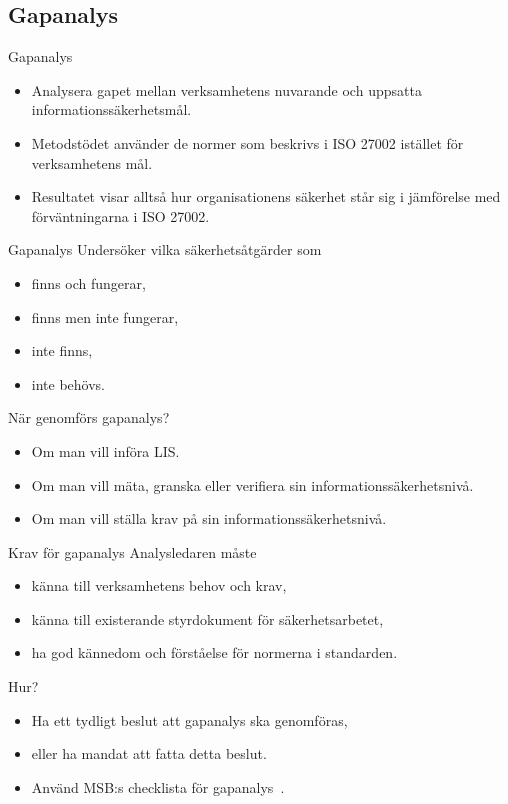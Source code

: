 \documentclass{beamer}
\begin{document}
\subsection{Gapanalys}
\begin{frame}{Gapanalys}
  \begin{itemize}
    \item Analysera gapet mellan verksamhetens nuvarande och uppsatta 
      informationssäkerhetsmål.
    \item Metodstödet använder de normer som beskrivs i ISO 27002 istället för 
      verksamhetens mål.
    \item Resultatet visar alltså hur organisationens säkerhet står sig 
      i jämförelse med förväntningarna i ISO 27002.
  \end{itemize}
\end{frame}
\begin{frame}{Gapanalys}
  Undersöker vilka säkerhetsåtgärder som
  \begin{itemize}
    \item finns och fungerar,
    \item finns men inte fungerar,
    \item inte finns,
    \item inte behövs.
  \end{itemize}
\end{frame}
\begin{frame}{När genomförs gapanalys?}
  \begin{itemize}
    \item Om man vill införa LIS\@.
    \item Om man vill mäta, granska eller verifiera sin 
      informationssäkerhetsnivå.
    \item Om man vill ställa krav på sin informationssäkerhetsnivå.
  \end{itemize}
\end{frame}
\begin{frame}{Krav för gapanalys}
  Analysledaren måste
  \begin{itemize}
    \item känna till verksamhetens behov och krav,
    \item känna till existerande styrdokument för säkerhetsarbetet,
    \item ha god kännedom och förståelse för normerna i standarden.
  \end{itemize}
\end{frame}
\begin{frame}{Hur?}
  \begin{itemize}
    \item Ha ett tydligt beslut att gapanalys ska genomföras,
    \item eller ha mandat att fatta detta beslut.
    \item Använd MSB:s checklista för gapanalys~\cite{MSB2011gb}.
  \end{itemize}
\end{frame}
\end{document}
